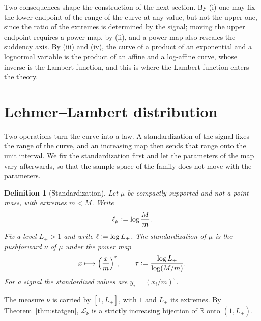 \documentclass[sn-mathphys-num]{sn-jnl}\newcommand{\SNJNL}{}
\theoremstyle{thmstyleone}
\theoremstyle{thmstyletwo}
\theoremstyle{thmstylethree}
\newtheorem{definition}{Definition}
\theoremstyle{thmstyleone}
\providecommand{\R}{\mathbb{R}}
\providecommand{\Leh}{\mathscr{L}}
\providecommand{\eqdef}{\mathrel{\vcentcolon=}}
\begin{document}
	Two consequences shape the construction of the next section. By
	(i) one may fix the lower endpoint of the range of the curve at any
	value, but not the upper one, since the ratio of the extremes is
	determined by the signal; moving the upper endpoint requires a power
	map, by (ii), and a power map also rescales the suddency axis. By
	(iii) and (iv), the curve of a product of an exponential and a
	lognormal variable is the product of an affine and a log-affine
	curve, whose inverse is the Lambert function, and this is where the
	Lambert function enters the theory.
	
	\section{Lehmer--Lambert distribution}\label{sec:ll}
	
	Two operations turn the curve into a law. A standardization of the
	signal fixes the range of the curve, and an increasing map then
	sends that range onto the unit interval. We fix the standardization
	first and let the parameters of the map vary afterwards, so that the
	sample space of the family does not move with the parameters.
	
	\begin{definition}[Standardization]\label{def:standard}
		Let $\mu$ be compactly supported and not a point mass, with
		extremes $m<M$. Write
		\begin{equation}\label{eq:ellmu}
			\ell_\mu\eqdef\log\frac{M}{m}.
		\end{equation}
		Fix a level $L_+>1$ and write $\ell\eqdef\log L_+$. The
		\emph{standardization} of $\mu$ is the pushforward $\nu$ of $\mu$
		under the power map
		\begin{equation}\label{eq:standardization}
			x\longmapsto\Bigl(\frac xm\Bigr)^{\tau},
			\qquad
			\tau\eqdef\frac{\log L_+}{\log(M/m)} .
		\end{equation}
		For a signal the standardized values are $y_i=(x_i/m)^{\tau}$.
	\end{definition}
	
	The measure $\nu$ is carried by $[1,L_+]$, with $1$ and $L_+$ its
	extremes. By Theorem~\ref{thm:statgen}, $\Leh_\nu$ is a strictly
	increasing bijection of $\R$ onto $(1,L_+)$.
	
\end{document}
